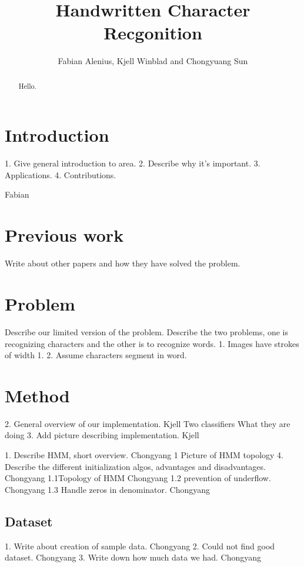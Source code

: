 \documentclass[11pt]{article}
\author{Fabian Alenius, Kjell Winblad and Chongyuang Sun} \title{Handwritten Character Recgonition}
\begin{document}
\maketitle

\begin{abstract}
Hello.

\end{abstract}

\section{Introduction}
1. Give general introduction to area.
2. Describe why it's important.
3. Applications.
4. Contributions.

\cite{trec}
Fabian


\section{Previous work}
Write about other papers and how they have solved the problem.

\section{Problem}
Describe our limited version of the problem.
Describe the two problems, one is recognizing characters and the other is to recognize words.
1. Images have strokes of width 1.
2. Assume characters segment in word.

\section{Method}\label{sec:method}
2. General overview of our implementation.   Kjell
	Two classifiers
		What they are doing
3. Add picture describing implementation.  Kjell

1. Describe HMM, short overview. Chongyang
1 Picture of HMM topology
4. Describe the different initialization algos, advantages and disadvantages. Chongyang
1.1Topology of HMM Chongyang
1.2 prevention of underflow. Chongyang
1.3 Handle zeros in denominator. Chongyang 




\subsection{Dataset}\label{sec:dataset}
1. Write about creation of sample data. Chongyang
2. Could not find good dataset. Chongyang
3. Write down how much data we had. Chongyang
\end{document}
